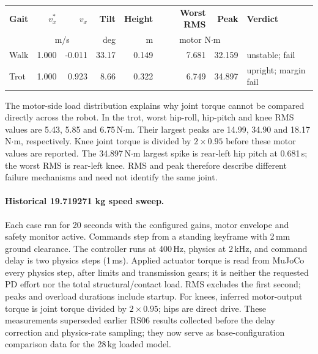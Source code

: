 \documentclass[11pt,a4paper]{article}
\begin{document}
\begin{center}\small
\begin{tabular}{@{}lrrrrrrl@{}}
\toprule
\textbf{Gait} & $v_x^*$ & $v_x$ & \textbf{Tilt} & \textbf{Height} &
\textbf{Worst RMS} & \textbf{Peak} & \textbf{Verdict} \\
 & \multicolumn{2}{c}{m/s} & deg & m & \multicolumn{2}{c}{motor N$\cdot$m} & \\
\midrule
Walk & 1.000 & -0.011 & 33.17 & 0.149 & 7.681 & 32.159 & unstable; fail \\
Trot & 1.000 & 0.923 & 8.66 & 0.322 & 6.749 & 34.897 & upright; margin fail \\
\bottomrule
\end{tabular}
\end{center}

The motor-side load distribution explains why joint torque cannot be compared
directly across the robot. In the trot, worst hip-roll, hip-pitch and knee RMS
values are 5.43, 5.85 and 6.75\,N$\cdot$m. Their largest peaks are 14.99,
34.90 and 18.17\,N$\cdot$m, respectively. Knee joint torque is divided by
$2\times0.95$ before these motor values are reported. The 34.897\,N$\cdot$m
largest spike is rear-left hip pitch at 0.681\,s; the worst RMS is rear-left
knee. RMS and peak therefore describe different failure mechanisms and need
not identify the same joint.

\paragraph{Historical 19.719271 kg speed sweep.}

Each case ran for 20 seconds with the configured gains, motor envelope and
safety monitor active. Commands step from a standing keyframe with 2\,mm ground
clearance. The controller runs at 400\,Hz, physics at 2\,kHz, and command delay
is two physics steps (1\,ms). Applied actuator torque is read from MuJoCo
 every physics step, after limits and transmission gears;
it is neither the requested PD effort nor the total structural/contact load.
RMS excludes the first second; peaks and overload durations include startup.
For knees, inferred motor-output torque is joint torque divided by
$2\times0.95$; hips are direct drive. These measurements superseded earlier
RS06 results collected before the delay correction and physics-rate sampling;
they now serve as base-configuration comparison data for the 28\,kg loaded
model.
\end{document}
